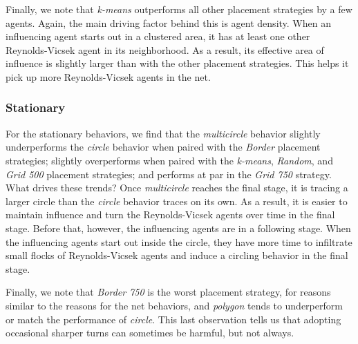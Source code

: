 Finally, we note that \textit{k-means} outperforms all other placement strategies
by a few agents.
Again, the main driving factor behind this is agent density.
When an influencing agent starts out in a clustered area, it has at least one
other Reynolds-Vicsek agent in its neighborhood.
As a result, its effective area of influence is slightly larger than with the
other placement strategies.
This helps it pick up more Reynolds-Vicsek agents in the net.

\subsubsection{Stationary}
For the stationary behaviors, we find that the \textit{multicircle} behavior
slightly underperforms the \textit{circle} behavior when paired with the
\textit{Border} placement strategies; slightly overperforms when paired
with the  \textit{k-means}, \textit{Random}, and \textit{Grid 500} placement
strategies; and performs at par in the \textit{Grid 750} strategy.
What drives these trends?
Once \textit{multicircle} reaches the final stage, it is tracing a larger
circle than the \textit{circle} behavior traces on its own.
As a result, it is easier to maintain influence and turn the Reynolds-Vicsek
agents over time in the final stage.
Before that, however, the influencing agents are in a following stage.
When the influencing agents start out inside the circle, they have more time to
infiltrate small flocks of Reynolds-Vicsek agents and induce a circling
behavior in the final stage.

Finally, we note that \textit{Border 750} is the worst placement strategy,
for reasons similar to the reasons for the net behaviors, and \textit{polygon}
tends to underperform or match the performance of \textit{circle}.
This last observation tells us that adopting occasional sharper turns can
sometimes be harmful, but not always.

